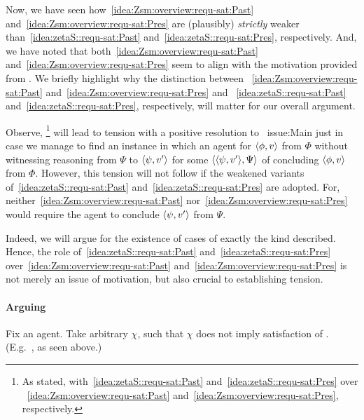 \begin{note}
  Now, we have seen how~\ref{idea:Zsm:overview:requ-sat:Past} and~\ref{idea:Zsm:overview:requ-sat:Pres} are (plausibly) \emph{strictly} weaker than~\ref{idea:zetaS::requ-sat:Past} and~\ref{idea:zetaS::requ-sat:Pres}, respectively.
  And, we have noted that both~\ref{idea:Zsm:overview:requ-sat:Past} and~\ref{idea:Zsm:overview:requ-sat:Pres} seem to align with the motivation provided from \csN{}.
  We briefly highlight why the distinction between ~\ref{idea:Zsm:overview:requ-sat:Past} and~\ref{idea:Zsm:overview:requ-sat:Pres} and ~\ref{idea:zetaS::requ-sat:Past} and~\ref{idea:zetaS::requ-sat:Pres}, respectively, will matter for our overall argument.

  Observe, \csN{}%
  \footnote{
    As stated, with~\ref{idea:zetaS::requ-sat:Past} and~\ref{idea:zetaS::requ-sat:Pres} over ~\ref{idea:Zsm:overview:requ-sat:Past} and~\ref{idea:Zsm:overview:requ-sat:Pres}, respectively.
  }
  will lead to tension with a positive resolution to~{\color{red} issue:Main} just in case we manage to find an instance in which an agent \csN{} for \(\langle \phi, v \rangle\) from \(\Phi\) without witnessing reasoning from \(\Psi\) to \(\langle \psi, v' \rangle\) for some \requ{} \(\langle \langle \psi, v' \rangle, \Psi \rangle\) of concluding \(\langle \phi, v \rangle\) from \(\Phi\).
  However, this tension will not follow if the weakened variants of~\ref{idea:zetaS::requ-sat:Past} and~\ref{idea:zetaS::requ-sat:Pres} are adopted.
  For, neither~\ref{idea:Zsm:overview:requ-sat:Past} nor~\ref{idea:Zsm:overview:requ-sat:Pres} would require the agent to conclude \(\langle \psi, v' \rangle\) from \(\Psi\).

  Indeed, we will argue for the existence of cases of exactly the kind described.
  Hence, the role of~\ref{idea:zetaS::requ-sat:Past} and~\ref{idea:zetaS::requ-sat:Pres} over~\ref{idea:Zsm:overview:requ-sat:Past} and~\ref{idea:Zsm:overview:requ-sat:Pres} is not merely an issue of motivation, but also crucial to establishing tension.
\end{note}

\paragraph*{Arguing}

\begin{note}
  Fix an agent.
  Take arbitrary \(\chi\), such that \(\chi\) does not imply satisfaction of \izetaS{}.
  (E.g.\ \izetaSm{}, as seen above.)
\end{note}

